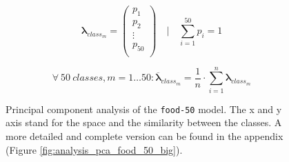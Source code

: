 \documentclass[10pt]{article}
\newcommand\inputpgf[2]{{
\let\pgfimageWithoutPath\pgfimage
\renewcommand{\pgfimage}[2][]{\pgfimageWithoutPath[##1]{#1/##2}}

}}
\newif\ifen
\newif\ifde
\newcommand{\en}[1]{\ifen#1\fi}
\newcommand{\de}[1]{\ifde#1\fi}
\begin{document}
					\begin{equation}
						\boldsymbol\lambda_{class_{m}} = 
						\left(
							\begin{array}{c}
							p_{1}\\
							p_{2}\\
							\vdots\\
							p_{50}\\
							\end{array}
						\right)
						\quad\Biggl\lvert \quad \sum_{i=1}^{50} p_i = 1
					\end{equation}
					
					\de{Von diesen Wahrscheinlichkeitsvektoren wird nun jeweils für jede Klasse ein Durchschnittsvektor aller \(n\) Elemente bestimmt, welche zur entsprechenden Klasse wirklich gehören. Somit erhält also für dieses 50 Klassenmodell entsprechend 50 Klassenvektoren mit der Dimension 50.}
					\en{From these probability vectors, an average vector of all \(n\) elements is calculated for each class, which really belongs to the respective class. For this 50 class model, 50 class vectors with the dimension of 50 are obtained.:}
					
					\begin{equation}
						\label{eq:equation_hierarchical_classification_mean}
						\forall\ 50\ classes, m = 1 \dots 50:
						\overline{\boldsymbol\lambda}_{class_{m}} =
						\frac{1}{n} \cdot \sum_{i=1}^{n} \boldsymbol\lambda_{class_{m}}
					\end{equation}
					
					\de{Mittels Principal component analysis werden diese mehrdimensionalen Vektoren in einem zweidimensionalen Raum transformiert, um diese grafisch darstellen zu können.} 
					\en{Principal component analysis is used to transform these multidimensional vectors into a two-dimensional space in order to display them visually (Figure \ref{fig:analysis_pca_food_50}).}
				
					\begin{figure}[H]
						\begin{center}
							\scalebox{0.5}{
								\inputpgf{images/pgf}{pca.pgf}
							}
						\end{center}
						\caption[Principal component analysis of the \texttt{food-50} model]{Principal component analysis of the \texttt{food-50} model. The x and y axis stand for the space and the similarity between the classes. A more detailed and complete version can be found in the appendix (Figure \ref{fig:analysis_pca_food_50_big}).}
						\label{fig:analysis_pca_food_50}
					\end{figure}
					
\end{document}
